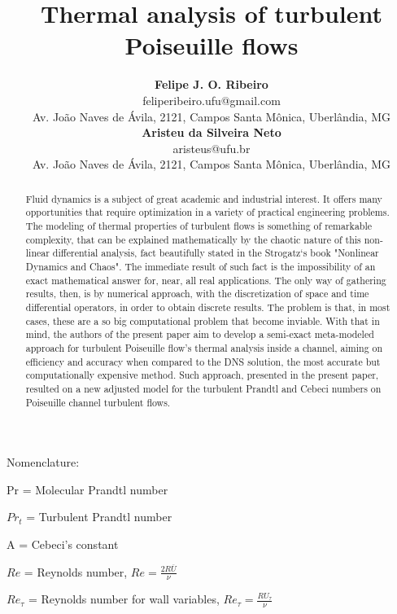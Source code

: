 \documentclass[10pt]{article} %
\title{ \loll Thermal analysis of turbulent Poiseuille flows}
\author{\textbf{Felipe J. O. Ribeiro} \\ 
	    \small{feliperibeiro.ufu@gmail.com} \\
	    \vspace{0.2cm}
	    \small{Av. Jo\~{a}o Naves de \'Avila, 2121, Campos Santa M\^{o}nica, Uberl\^{a}ndia, MG}\\
	    \textbf{Aristeu da Silveira Neto}\\
	    \small{aristeus@ufu.br}\\
    \small{Av. Jo\~{a}o Naves de \'Avila, 2121, Campos Santa M\^{o}nica, Uberl\^{a}ndia, MG}\\
}
\begin{document}
	

\maketitle


\begin{abstract}
	\noindent Fluid dynamics is a subject of great academic and industrial interest. It offers many opportunities that require optimization in a variety of practical engineering problems. The modeling of thermal properties of turbulent flows is something of remarkable complexity, that can be explained mathematically by the chaotic nature of this non-linear differential analysis, fact beautifully stated in the Strogatz`s book "Nonlinear Dynamics and Chaos". The immediate result of such fact is the impossibility of an exact mathematical answer for, near, all real applications. The only way of gathering results, then, is by numerical approach, with the discretization of space and time differential operators, in order to obtain discrete results. The problem is that, in most cases, these are a so big computational problem that become inviable. With that in mind, the authors of the present paper aim to develop a semi-exact meta-modeled approach for turbulent Poiseuille flow's thermal analysis inside a channel, aiming on efficiency and accuracy when compared to the DNS solution, the most accurate but computationally expensive method. Such approach, presented in the present paper, resulted on a new adjusted model for the turbulent Prandtl and Cebeci numbers on Poiseuille channel turbulent flows.
\end{abstract} 

\vspace{8.0mm}

\begin{LARGE}
	Nomenclature: 
\end{LARGE} 


	Pr = Molecular Prandtl number
	
	$ Pr_t $ = Turbulent Prandtl number 
	
	A = Cebeci's constant
	
	
	$Re$ = Reynolds number, $Re = \frac{2R \overline{U}}{\nu}$
	
	
	$Re_\tau$ = Reynolds number for wall variables, $Re_\tau = \frac{R U_\tau}{\nu}$
	
\end{document}
